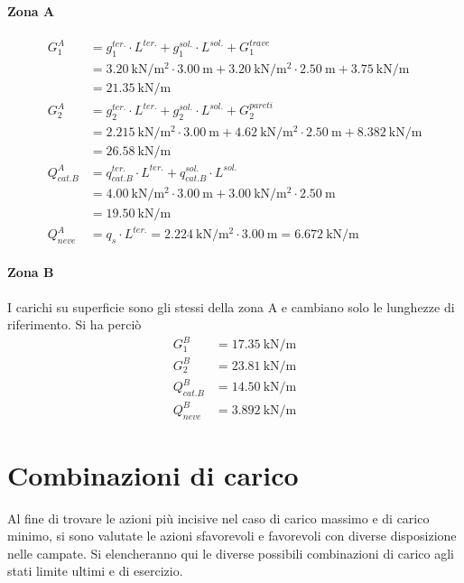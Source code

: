 \paragraph*{Zona A} 
\[
\begin{split}
G_1^A &=  g_1^{ter.}\cdot L^{ter.} + g_1^{sol.}\cdot L^{sol.} + G_1^{trave} \\
&= \SI{3.20}{\kilo\newton\per\square\meter}\cdot\SI{3.00}{\meter} + \SI{3.20}{\kilo\newton\per\square\meter}\cdot\SI{2.50}{\meter} + \SI{3.75}{\kilo\newton\per\meter} \\
&= \SI{21.35}{\kilo\newton\per\meter} \\
G_2^A &= g_2^{ter.}\cdot L^{ter.} + g_2^{sol.}\cdot L^{sol.} + G_2^{pareti} \\
&= \SI{2.215}{\kilo\newton\per\square\meter}\cdot\SI{3.00}{\meter} + \SI{4.62}{\kilo\newton\per\square\meter}\cdot\SI{2.50}{\meter} + \SI{8.382}{\kilo\newton\per\meter} \\
&= \SI{26.58}{\kilo\newton\per\meter}\\
Q_{cat. B}^A &= q_{cat. B}^{ter.}\cdot L^{ter.} + q_{cat. B}^{sol.}\cdot L^{sol.} \\
&= \SI{4.00}{\kilo\newton\per\square\meter}\cdot\SI{3.00}{\meter} + \SI{3.00}{\kilo\newton\per\square\meter}\cdot\SI{2.50}{\meter} \\
&= \SI{19.50}{\kilo\newton\per\meter}\\
Q_{neve}^A &= q_s \cdot L^{ter.} = \SI{2.224}{\kilo\newton\per\square\meter}\cdot\SI{3.00}{\meter} = \SI{6.672}{\kilo\newton\per\meter}
\end{split}
\]
\paragraph*{Zona B} I carichi su superficie sono gli stessi della zona A e cambiano solo le lunghezze di riferimento. 
Si ha perciò
\begin{align*}
G_1^B &= \SI{17.35}{\kilo\newton\per\meter}\\
G_2^B &= \SI{23.81}{\kilo\newton\per\meter}\\
Q_{cat. B}^B &=  \SI{14.50}{\kilo\newton\per\meter}\\
Q_{neve}^B &= \SI{3.892}{\kilo\newton\per\meter}
\end{align*}
\section{Combinazioni di carico}
Al fine di trovare le azioni più incisive nel caso di carico massimo e di carico minimo, si sono valutate le azioni sfavorevoli e favorevoli con diverse disposizione nelle campate. 
Si elencheranno qui le diverse possibili combinazioni di carico agli stati limite ultimi e di esercizio.
